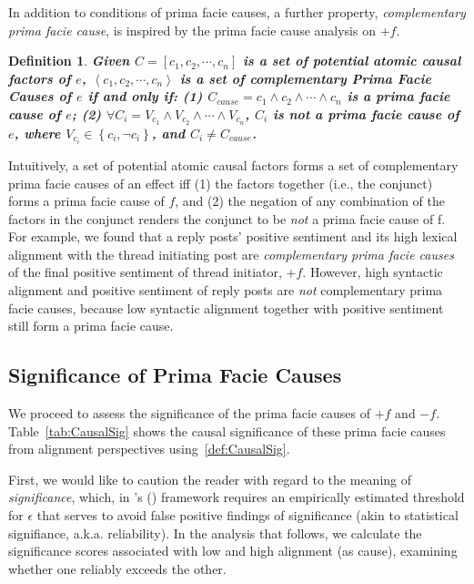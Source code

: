 \documentclass[man,biblatex,floatsintext]{apa6}
\newtheorem{defn}[thm]{Definition}
\newcommand{\citegen}[1]{\citeauthor{#1}'s (\citeyear{#1})}
\begin{document}
In addition to conditions of prima facie causes, a further property, \emph{complementary prima facie cause}, is inspired by the prima facie cause analysis on $+f$.  
\begin{defn}
\textbf{Given $C=[c_{1}, c_{2}, \cdots, c_{n}]$ is a set of potential atomic causal factors of $e$, $\left \langle c_{1}, c_{2}, \cdots , c_{n} \right \rangle$ is a set of complementary Prima Facie Causes of $e$ if and only if: (1) $C_{cause}=c_{1} \wedge c_{2} \wedge \cdots \wedge c_{n}$ is a prima facie cause of $e$; (2) $\forall C_{i}= V_{c_{1}} \wedge V_{c_{2}} \wedge \cdots \wedge V_{c_{n}}$, $C_{i}$ is not a prima facie cause of $e$, where $V_{c_{i}} \in \left \{ c_{i}, \neg c_{i}\right \}$, and $C_{i} \neq C_{cause}$.} 
\end{defn}
Intuitively, a set of potential atomic causal factors forms a set of complementary
prima facie causes of an effect iff (1) the factors together (i.e., the conjunct) forms a prima facie cause of $f$, and (2) the negation of any combination of the factors in the conjunct renders the conjunct to be {\em not} a prima facie cause of f. For example, we found that a reply posts' positive sentiment and its high lexical alignment with the thread initiating post are \emph{complementary prima facie causes} of the final positive sentiment of thread initiator, $+f$. 
However, high syntactic alignment and positive sentiment of reply posts are {\em not} complementary prima facie causes, because low syntactic alignment together with positive sentiment still form a prima facie cause. 



\subsection{Significance of Prima Facie Causes}

We proceed to assess the significance of the prima facie causes of $+f$ and $-f$. Table~\ref{tab:CausalSig} shows the causal significance of these prima facie causes from alignment perspectives using~\ref{def:CausalSig}.

First, we would like to caution the reader with regard to the meaning of \emph{significance}, which, in \citegen{kleinberg_uai09} framework requires an empirically estimated threshold for $\epsilon$ that serves to avoid false positive findings of significance (akin to statistical signifiance, a.k.a. reliability).  In the analysis that follows, we calculate the significance scores associated with low and high alignment (as cause), examining whether one reliably exceeds the other.  
\end{document}
